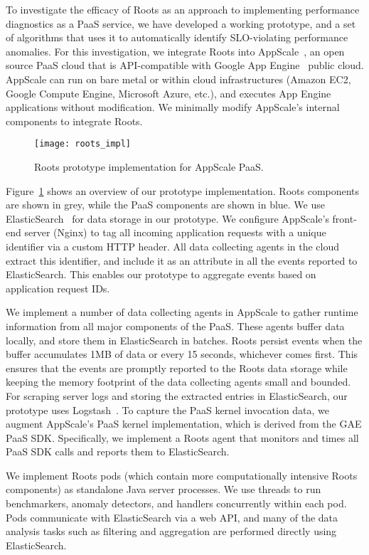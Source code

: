 To investigate the efficacy of Roots as an approach to
implementing performance diagnostics as a PaaS service, we have developed a
working prototype, and a set of algorithms that uses it to automatically
identify SLO-violating performance anomalies.
For this investigation, we integrate Roots into AppScale~\cite{6488671}, an open source PaaS cloud
that is API-compatible with Google App Engine~\cite{gae} public cloud.  
AppScale can run on bare metal or within cloud infrastructures (Amazon EC2, Google Compute Engine, 
 Microsoft Azure, etc.), and executes App Engine applications without modification.
We minimally modify AppScale's internal components to integrate Roots.

\begin{figure}
\centering
\texttt{[image: roots\_impl]}
\caption{Roots prototype implementation for AppScale PaaS.}
\label{fig:roots_impl}
\end{figure}

Figure~\ref{fig:roots_impl} shows an overview of our prototype implementation. Roots components
are shown in grey, while the PaaS components are shown in blue.
We use ElasticSearch~\cite{Kononenko:2014:MMR:2597073.2597091} for data storage in our prototype. 
We configure AppScale's front-end server (Nginx) to tag all incoming application requests
with a unique identifier via a custom HTTP header. 
All data collecting agents in the cloud extract this identifier, and include it as an attribute
in all the events reported to ElasticSearch. This enables our prototype to aggregate events based 
on application request IDs.

We implement a number of data collecting agents in AppScale to gather runtime information
from all major components of the PaaS. These agents buffer data locally, and store them in ElasticSearch
in batches. Roots persist events when the buffer accumulates 1MB of data or every 15 seconds, whichever comes
first.  This ensures that the events are promptly reported to the Roots data
storage while keeping the memory footprint of the data collecting agents small and bounded. 
For scraping server logs and storing the extracted entries in ElasticSearch,
our prototype uses Logstash~\cite{logstash}. 
To capture the PaaS kernel invocation data, we augment AppScale's PaaS kernel implementation,
which is derived from the GAE PaaS SDK. Specifically, we implement a Roots agent that monitors
and times all PaaS SDK calls and reports them to ElasticSearch. 

We implement Roots pods (which  contain more computationally intensive Roots components) 
as standalone Java server processes. We use threads to run benchmarkers,
anomaly detectors, and handlers concurrently within each pod. Pods communicate with ElasticSearch via
a web API, and many of the data analysis tasks such as filtering and aggregation are performed
directly using ElasticSearch.

